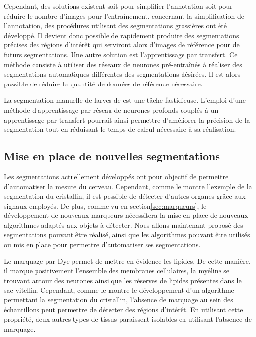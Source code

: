 \documentclass[\main/main.tex]{subfiles}
\begin{document}
%
Cependant, des solutions existent soit pour simplifier l'annotation soit pour réduire le nombre d'images pour l'entraînement.
%
concernant la simplification de l'annotation, des procédures utilisant des segmentations grossières ont été développé\cite{rajchl_2017}.
%
Il devient donc possible de rapidement produire des segmentations précises des régions d'intérêt qui serviront alors d'images de référence pour de futurs segmentations.
%
Une autre solution est l'apprentissage par transfert.
%
Ce méthode consiste à utiliser des réseaux de neurones pré-entraînés à réaliser des segmentations automatiques différentes des segmentations désirées.
%
Il est alors possible de réduire la quantité de données de référence nécessaire.

%
La segmentation manuelle de larves de \pz{} est une tâche fastidieuse.
%
L'emploi d'une méthode d'apprentissage par réseau de neurones profonds couplés à un apprentissage par transfert pourrait ainsi permettre d'améliorer la précision de la segmentation tout en réduisant le temps de calcul nécessaire à sa réalisation.

    \subsection{Mise en place de nouvelles segmentations}
 
%   
Les segmentations actuellement développés ont pour objectif de permettre d'automatiser la mesure du cerveau.
%
Cependant, comme le montre l'exemple de la segmentation du cristallin,
il est possible de détecter d'autres organes grâce aux signaux employés.
%
De plus, comme vu en section\ref{sec:marqueurs}, le développement de nouveaux marqueurs nécessitera la mise en place de nouveaux algorithmes adaptés aux objets à détecter.
%
Nous allons maintenant proposé des segmentations pouvant être réalisé, ainsi que les algorithmes pouvant être utilisés ou mis en place pour permettre d'automatiser ses segmentations.

%
Le marquage par Dye permet de mettre en évidence les lipides.
%
De cette manière, il marque positivement l'ensemble des membranes cellulaires, la myéline se trouvant autour des neurones ainsi que les réserves de lipides présentes dans le sac vitellin.
%
Cependant, comme le montre le développement d'un algorithme permettant la segmentation du cristallin, l'absence de marquage au sein des échantillons peut permettre de détecter des régions d'intérêt.
%
En utilisant cette propriété, deux autres types de tissus paraissent isolables en utilisant l'absence de marquage.
%
\end{document}
